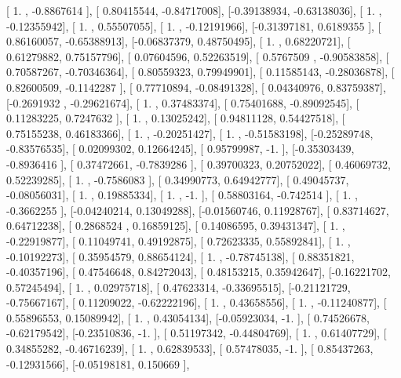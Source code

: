 \documentclass{article}
\begin{document}
       [ 1.        , -0.8867614 ],
       [ 0.80415544, -0.84717008],
       [-0.39138934, -0.63138036],
       [ 1.        , -0.12355942],
       [ 1.        ,  0.55507055],
       [ 1.        , -0.12191966],
       [-0.31397181,  0.6189355 ],
       [ 0.86160057, -0.65388913],
       [-0.06837379,  0.48750495],
       [ 1.        ,  0.68220721],
       [ 0.61279882,  0.75157796],
       [ 0.07604596,  0.52263519],
       [ 0.5767509 , -0.90583858],
       [ 0.70587267, -0.70346364],
       [ 0.80559323,  0.79949901],
       [ 0.11585143, -0.28036878],
       [ 0.82600509, -0.1142287 ],
       [ 0.77710894, -0.08491328],
       [ 0.04340976,  0.83759387],
       [-0.2691932 , -0.29621674],
       [ 1.        ,  0.37483374],
       [ 0.75401688, -0.89092545],
       [ 0.11283225,  0.7247632 ],
       [ 1.        ,  0.13025242],
       [ 0.94811128,  0.54427518],
       [ 0.75155238,  0.46183366],
       [ 1.        , -0.20251427],
       [ 1.        , -0.51583198],
       [-0.25289748, -0.83576535],
       [ 0.02099302,  0.12664245],
       [ 0.95799987, -1.        ],
       [-0.35303439, -0.8936416 ],
       [ 0.37472661, -0.7839286 ],
       [ 0.39700323,  0.20752022],
       [ 0.46069732,  0.52239285],
       [ 1.        , -0.7586083 ],
       [ 0.34990773,  0.64942777],
       [ 0.49045737, -0.08056031],
       [ 1.        ,  0.19885334],
       [ 1.        , -1.        ],
       [ 0.58803164, -0.742514  ],
       [ 1.        , -0.3662255 ],
       [-0.04240214,  0.13049288],
       [-0.01560746,  0.11928767],
       [ 0.83714627,  0.64712238],
       [ 0.2868524 ,  0.16859125],
       [ 0.14086595,  0.39431347],
       [ 1.        , -0.22919877],
       [ 0.11049741,  0.49192875],
       [ 0.72623335,  0.55892841],
       [ 1.        , -0.10192273],
       [ 0.35954579,  0.88654124],
       [ 1.        , -0.78745138],
       [ 0.88351821, -0.40357196],
       [ 0.47546648,  0.84272043],
       [ 0.48153215,  0.35942647],
       [-0.16221702,  0.57245494],
       [ 1.        ,  0.02975718],
       [ 0.47623314, -0.33695515],
       [-0.21121729, -0.75667167],
       [ 0.11209022, -0.62222196],
       [ 1.        ,  0.43658556],
       [ 1.        , -0.11240877],
       [ 0.55896553,  0.15089942],
       [ 1.        ,  0.43054134],
       [-0.05923034, -1.        ],
       [ 0.74526678, -0.62179542],
       [-0.23510836, -1.        ],
       [ 0.51197342, -0.44804769],
       [ 1.        ,  0.61407729],
       [ 0.34855282, -0.46716239],
       [ 1.        ,  0.62839533],
       [ 0.57478035, -1.        ],
       [ 0.85437263, -0.12931566],
       [-0.05198181,  0.150669  ],
\end{document}

